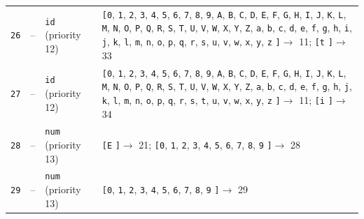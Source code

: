 \documentclass[11pt,a4paper]{article}
\newcommand{\opensymbolset}{\texttt{[}}
\newcommand{\closesymbolset}{\texttt{]}}
\begin{document}
\begin{landscape}
\begin{longtable}{
    >{\centering\arraybackslash}p{0.8cm}
    >{\centering\arraybackslash}p{0.7cm}
    >{\raggedright\arraybackslash}p{3.7cm}
    >{\raggedright\arraybackslash}p{18.1cm}
}
\texttt{26} & -- & \texttt{id} (priority 12) & \opensymbolset \texttt{0}, \texttt{1}, \texttt{2}, \texttt{3}, \texttt{4}, \texttt{5}, \texttt{6}, \texttt{7}, \texttt{8}, \texttt{9}, \texttt{A}, \texttt{B}, \texttt{C}, \texttt{D}, \texttt{E}, \texttt{F}, \texttt{G}, \texttt{H}, \texttt{I}, \texttt{J}, \texttt{K}, \texttt{L}, \texttt{M}, \texttt{N}, \texttt{O}, \texttt{P}, \texttt{Q}, \texttt{R}, \texttt{S}, \texttt{T}, \texttt{U}, \texttt{V}, \texttt{W}, \texttt{X}, \texttt{Y}, \texttt{Z}, \texttt{a}, \texttt{b}, \texttt{c}, \texttt{d}, \texttt{e}, \texttt{f}, \texttt{g}, \texttt{h}, \texttt{i}, \texttt{j}, \texttt{k}, \texttt{l}, \texttt{m}, \texttt{n}, \texttt{o}, \texttt{p}, \texttt{q}, \texttt{r}, \texttt{s}, \texttt{u}, \texttt{v}, \texttt{w}, \texttt{x}, \texttt{y}, \texttt{z} \closesymbolset $\to$ 11; \opensymbolset \texttt{t} \closesymbolset $\to$ 33 \\
\texttt{27} & -- & \texttt{id} (priority 12) & \opensymbolset \texttt{0}, \texttt{1}, \texttt{2}, \texttt{3}, \texttt{4}, \texttt{5}, \texttt{6}, \texttt{7}, \texttt{8}, \texttt{9}, \texttt{A}, \texttt{B}, \texttt{C}, \texttt{D}, \texttt{E}, \texttt{F}, \texttt{G}, \texttt{H}, \texttt{I}, \texttt{J}, \texttt{K}, \texttt{L}, \texttt{M}, \texttt{N}, \texttt{O}, \texttt{P}, \texttt{Q}, \texttt{R}, \texttt{S}, \texttt{T}, \texttt{U}, \texttt{V}, \texttt{W}, \texttt{X}, \texttt{Y}, \texttt{Z}, \texttt{a}, \texttt{b}, \texttt{c}, \texttt{d}, \texttt{e}, \texttt{f}, \texttt{g}, \texttt{h}, \texttt{j}, \texttt{k}, \texttt{l}, \texttt{m}, \texttt{n}, \texttt{o}, \texttt{p}, \texttt{q}, \texttt{r}, \texttt{s}, \texttt{t}, \texttt{u}, \texttt{v}, \texttt{w}, \texttt{x}, \texttt{y}, \texttt{z} \closesymbolset $\to$ 11; \opensymbolset \texttt{i} \closesymbolset $\to$ 34 \\
\texttt{28} & -- & \texttt{num} (priority 13) & \opensymbolset \texttt{E} \closesymbolset $\to$ 21; \opensymbolset \texttt{0}, \texttt{1}, \texttt{2}, \texttt{3}, \texttt{4}, \texttt{5}, \texttt{6}, \texttt{7}, \texttt{8}, \texttt{9} \closesymbolset $\to$ 28 \\
\texttt{29} & -- & \texttt{num} (priority 13) & \opensymbolset \texttt{0}, \texttt{1}, \texttt{2}, \texttt{3}, \texttt{4}, \texttt{5}, \texttt{6}, \texttt{7}, \texttt{8}, \texttt{9} \closesymbolset $\to$ 29 \\

\end{longtable}
\end{landscape}
\end{document}
